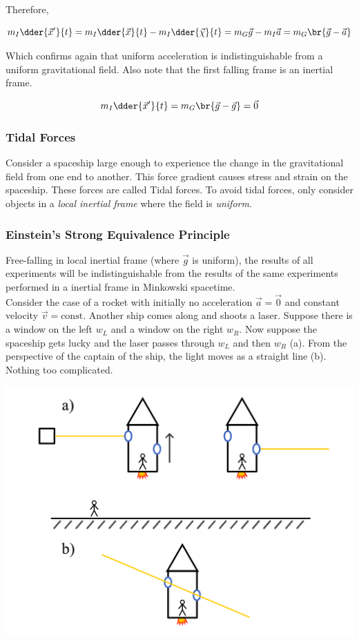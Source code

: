 \documentclass{article}
\begin{document}
Therefore,

\[ m_I \dder{\vec{x}'}{t} = m_I \dder{\vec{x}}{t} - m_I \dder{\vec{\chi}}{t} = m_G \vec{g} - m_I \vec{a} = m_G \br{\vec{g} - \vec{a}} \]

Which confirms again that uniform acceleration is indistinguishable from a uniform gravitational field. Also note that the first falling frame is an inertial frame.

\[ m_I \dder{\vec{x}'}{t} = m_G\br{\vec{g} - \vec{g}} = \vec{0} \]

\subsubsection{Tidal Forces}

Consider a spaceship large enough to experience the change in the gravitational field from one end to another. This force gradient causes stress and strain on the spaceship. These forces are called Tidal forces. To avoid tidal forces, only consider objects in a \textit{local inertial frame} where the field is \textit{uniform}.

\subsubsection{Einstein's Strong Equivalence Principle}

Free-falling in local inertial frame (where $\vec{g}$ is uniform), the results of all experiments will be indistinguishable from the results of the same experiments performed in a inertial frame in Minkowski spacetime.\\

Consider the case of a rocket with initially no acceleration $\vec{a} = \vec{0}$ and constant velocity $\vec{v} = \text{const}$. Another ship comes along and shoots a laser. Suppose there is a window on the left $w_L$ and a window on the right $w_R$. Now suppose the spaceship gets lucky and the laser passes through $w_L$ and then $w_R$ (a). From the perspective of the captain of the ship, the light moves as a straight line (b). Nothing too complicated. \\

\begin{center}
    \includegraphics[scale=0.7]{figures/bend_light/constant_v.pdf}
\end{center}
\end{document}
